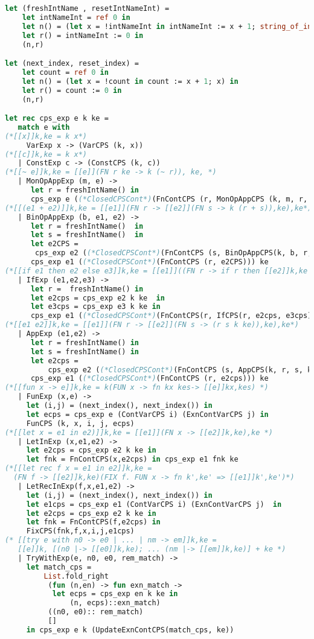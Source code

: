 \begin{lstlisting}[language=Caml, caption=definitions.ml]
let (freshIntName , resetIntNameInt) =
    let intNameInt = ref 0 in
    let n() = (let x = !intNameInt in intNameInt := x + 1; string_of_int x) in
    let r() = intNameInt := 0 in
    (n,r)

let (next_index, reset_index) = 
    let count = ref 0 in
    let n() = (let x = !count in count := x + 1; x) in
    let r() = count := 0 in
    (n,r)

let rec cps_exp e k ke = 
   match e with 
(*[[x]]k,ke = k x*)
     VarExp x -> (VarCPS (k, x))
(*[[c]]k,ke = k x*)
   | ConstExp c -> (ConstCPS (k, c))
(*[[~ e]]k,ke = [[e]](FN r ke -> k (~ r)), ke, *)
   | MonOpAppExp (m, e) ->
      let r = freshIntName() in
      cps_exp e ((*ClosedCPSCont*)(FnContCPS (r, MonOpAppCPS (k, m, r, ke)))) ke
(*[[(e1 + e2)]]k,ke = [[e1]](FN r -> [[e2]](FN s -> k (r + s)),ke),ke*)
   | BinOpAppExp (b, e1, e2) ->
      let r = freshIntName()  in 
      let s = freshIntName()  in 
      let e2CPS =
       cps_exp e2 ((*ClosedCPSCont*)(FnContCPS (s, BinOpAppCPS(k, b, r, s, ke)))) ke in
      cps_exp e1 ((*ClosedCPSCont*)(FnContCPS (r, e2CPS))) ke
(*[[if e1 then e2 else e3]]k,ke = [[e1]]((FN r -> if r then [[e2]]k,ke else [[e3]]k,ke),ke*)
   | IfExp (e1,e2,e3) ->
      let r =  freshIntName() in 
      let e2cps = cps_exp e2 k ke  in
      let e3cps = cps_exp e3 k ke in 
      cps_exp e1 ((*ClosedCPSCont*)(FnContCPS(r, IfCPS(r, e2cps, e3cps)))) ke
(*[[e1 e2]]k,ke = [[e1]](FN r -> [[e2]](FN s -> (r s k ke)),ke),ke*)
   | AppExp (e1,e2) -> 
      let r = freshIntName() in
      let s = freshIntName() in
      let e2cps =
          cps_exp e2 ((*ClosedCPSCont*)(FnContCPS (s, AppCPS(k, r, s, ke)))) ke in
      cps_exp e1 ((*ClosedCPSCont*)(FnContCPS (r, e2cps))) ke
(*[[fun x -> e]]k,ke = k(FUN x -> fn kx kes-> [[e]]kx,kes) *)
   | FunExp (x,e) ->
     let (i,j) = (next_index(), next_index()) in
     let ecps = cps_exp e (ContVarCPS i) (ExnContVarCPS j) in
     FunCPS (k, x, i, j, ecps)
(*[[let x = e1 in e2)]]k,ke = [[e1]](FN x -> [[e2]]k,ke),ke *)
   | LetInExp (x,e1,e2) -> 
     let e2cps = cps_exp e2 k ke in 
     let fnk = FnContCPS(x,e2cps) in cps_exp e1 fnk ke
(*[[let rec f x = e1 in e2]]k,ke =
  (FN f -> [[e2]]k,ke)(FIX f. FUN x -> fn k',ke' => [[e1]]k',ke')*)
   | LetRecInExp(f,x,e1,e2) ->
     let (i,j) = (next_index(), next_index()) in
     let e1cps = cps_exp e1 (ContVarCPS i) (ExnContVarCPS j)  in 
     let e2cps = cps_exp e2 k ke in 
     let fnk = FnContCPS(f,e2cps) in
     FixCPS(fnk,f,x,i,j,e1cps)
(* [[try e with n0 -> e0 | ... | nm -> em]]k,ke =
   [[e]]k, [(n0 |-> [[e0]]k,ke); ... (nm |-> [[em]]k,ke)] + ke *)
   | TryWithExp(e, n0, e0, rem_match) ->
     let match_cps =
         List.fold_right
          (fun (n,en) -> fun exn_match ->
           let ecps = cps_exp en k ke in
               (n, ecps)::exn_match)
          ((n0, e0):: rem_match)
          []
     in cps_exp e k (UpdateExnContCPS(match_cps, ke))


\end{lstlisting}
